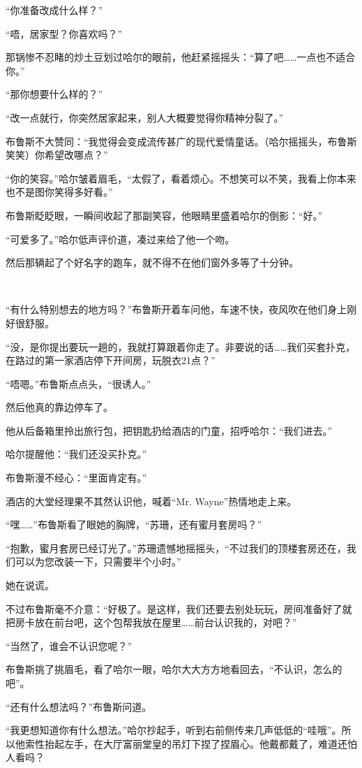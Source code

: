 \documentclass[../main]{subfiles}
\begin{document}
“你准备改成什么样？”

“唔，居家型？你喜欢吗？”

那锅惨不忍睹的炒土豆划过哈尔的眼前，他赶紧摇摇头：“算了吧……一点也不适合你。”

“那你想要什么样的？”

“改一点就行，你突然居家起来，别人大概要觉得你精神分裂了。”

布鲁斯不大赞同：“我觉得会变成流传甚广的现代爱情童话。（哈尔摇摇头，布鲁斯笑笑）你希望改哪点？”

“你的笑容。”哈尔皱着眉毛，“太假了，看着烦心。不想笑可以不笑，我看上你本来也不是图你笑得多好看。”

布鲁斯眨眨眼，一瞬间收起了那副笑容，他眼睛里盛着哈尔的倒影：“好。”

“可爱多了。”哈尔低声评价道，凑过来给了他一个吻。

然后那辆起了个好名字的跑车，就不得不在他们窗外多等了十分钟。

~\

“有什么特别想去的地方吗？”布鲁斯开着车问他，车速不快，夜风吹在他们身上刚好很舒服。

“没，是你提出要玩一趟的，我就打算跟着你走了。非要说的话……我们买套扑克，在路过的第一家酒店停下开间房，玩脱衣21点？”

“唔嗯。”布鲁斯点点头，“很诱人。”

然后他真的靠边停车了。

他从后备箱里拎出旅行包，把钥匙扔给酒店的门童，招呼哈尔：“我们进去。”

哈尔提醒他：“我们还没买扑克。”

布鲁斯漫不经心：“里面肯定有。”

酒店的大堂经理果不其然认识他，喊着“Mr. Wayne”热情地走上来。

“嘿……”布鲁斯看了眼她的胸牌，“苏珊，还有蜜月套房吗？”

“抱歉，蜜月套房已经订光了。”苏珊遗憾地摇摇头，“不过我们的顶楼套房还在，我们可以为您改装一下，只需要半个小时。”

她在说谎。

不过布鲁斯毫不介意：“好极了。是这样，我们还要去别处玩玩，房间准备好了就把房卡放在前台吧，这个包帮我放在屋里……前台认识我的，对吧？”

“当然了，谁会不认识您呢？”

布鲁斯挑了挑眉毛，看了哈尔一眼，哈尔大大方方地看回去，“不认识，怎么的吧”。

“还有什么想法吗？”布鲁斯问道。

“我更想知道你有什么想法。”哈尔抄起手，听到右前侧传来几声低低的“哇哦”。所以他索性抬起左手，在大厅富丽堂皇的吊灯下捏了捏眉心。他戴都戴了，难道还怕人看吗？
\end{document}
